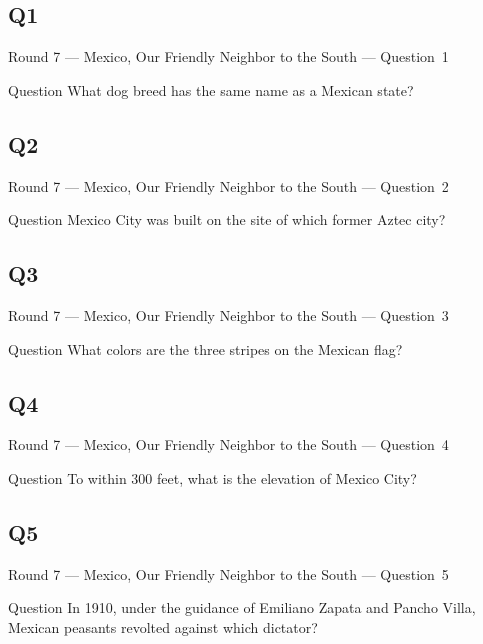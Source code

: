 \documentclass[11pt]{beamer}
\begin{document}
\subsection*{Q1}
\begin{frame}[t]{Round 7 --- Mexico, Our Friendly Neighbor to the South --- \mbox{Question 1}}
\vspace{-0.5em}
\begin{block}{Question}
What dog breed has the same name as a Mexican state?
\end{block}
\end{frame}
\subsection*{Q2}
\begin{frame}[t]{Round 7 --- Mexico, Our Friendly Neighbor to the South --- \mbox{Question 2}}
\vspace{-0.5em}
\begin{block}{Question}
Mexico City was built on the site of which former Aztec city?
\end{block}
\end{frame}
\subsection*{Q3}
\begin{frame}[t]{Round 7 --- Mexico, Our Friendly Neighbor to the South --- \mbox{Question 3}}
\vspace{-0.5em}
\begin{block}{Question}
What colors are the three stripes on the Mexican flag?
\end{block}
\end{frame}
\subsection*{Q4}
\begin{frame}[t]{Round 7 --- Mexico, Our Friendly Neighbor to the South --- \mbox{Question 4}}
\vspace{-0.5em}
\begin{block}{Question}
To within 300 feet, what is the elevation of Mexico City?
\end{block}
\end{frame}
\subsection*{Q5}
\begin{frame}[t]{Round 7 --- Mexico, Our Friendly Neighbor to the South --- \mbox{Question 5}}
\vspace{-0.5em}
\begin{block}{Question}
In 1910, under the guidance of Emiliano Zapata and Pancho Villa, Mexican peasants revolted against which dictator?
\end{block}
\end{frame}
\end{document}
